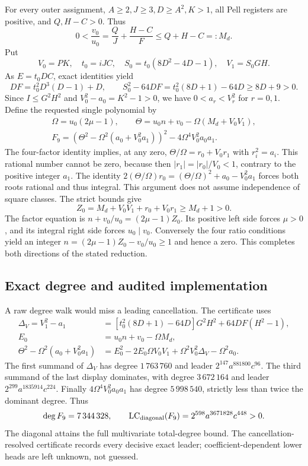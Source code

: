 For every outer assignment, \(A\geq2,J\geq3,D\geq A^2,K>1\), all Pell
registers are positive, and \(Q,H-C>0\). Thus
\[
 0<\frac{v_0}{u_0}=\frac QJ+\frac{H-C}{F}\leq Q+H-C=:M_d.
\]
Put
\[
 V_0=PK,\quad t_0=iJC,\quad S_0=t_0(8D^2-4D-1),\quad V_1=S_0GH.
\]
As \(E=t_0DC\), exact identities yield
\[
 DF=t_0^2D^3(D-1)+D,\qquad
 S_0^2-64DF=t_0^2(8D+1)-64D\geq8D+9>0.
\]
Since \(I\leq G^2H^2\) and \(V_0^2-a_0=K^2-1>0\), we have
\(0<a_r<V_r^2\) for \(r=0,1\).
Define the requested single polynomial by
\begin{gather*}
 \Omega=u_0(2\mu-1),\qquad
 \Theta=u_0n+v_0-\Omega(M_d+V_0V_1),\\
 \boxed{F_9=\left(\Theta^2-\Omega^2(a_0+V_0^2a_1)\right)^2
                    -4\Omega^4V_0^2a_0a_1.}
\end{gather*}
The four-factor identity implies, at any zero,
\(\Theta/\Omega=r_0+V_0r_1\) with \(r_i^2=a_i\).
This rational number cannot be zero, because then
\(|r_1|=|r_0|/V_0<1\), contrary to the positive integer \(a_1\).
The identity
\(2(\Theta/\Omega)r_0=(\Theta/\Omega)^2+a_0-V_0^2a_1\)
forces both roots rational and thus integral. This argument does not assume
independence of square classes.
The strict bounds give
\[
 Z_0=M_d+V_0V_1+r_0+V_0r_1\geq M_d+1>0.
\]
The factor equation is \(n+v_0/u_0=(2\mu-1)Z_0\).
Its positive left side forces \(\mu>0\), and its integral right side
forces \(u_0\mid v_0\). Conversely the four ratio conditions yield an
integer \(n=(2\mu-1)Z_0-v_0/u_0\geq1\) and hence a zero.
This completes both directions of the stated reduction.

\subsection{Exact degree and audited implementation}
A raw degree walk would miss a leading cancellation. The certificate uses
\begin{align*}
 \Delta_V=V_1^2-a_1
 &=[t_0^2(8D+1)-64D]G^2H^2+64DF(H^2-1),\\
 E_0&=u_0n+v_0-\Omega M_d,\\
 \Theta^2-\Omega^2(a_0+V_0^2a_1)
 &=E_0^2-2E_0\Omega V_0V_1+\Omega^2V_0^2\Delta_V-\Omega^2a_0.
\end{align*}
The first summand of \(\Delta_V\) has degree \(1\,763\,760\) and
leader \(2^{147}a^{881800}c^{96}\). The third summand of the last display
dominates, with degree \(3\,672\,164\) and leader
\(2^{299}a^{1835914}c^{224}\). Finally
\(4\Omega^4V_0^2a_0a_1\) has degree \(5\,998\,540\), strictly less than
twice the dominant degree. Thus
\[
 \deg F_9=7\,344\,328,\qquad
 \operatorname{LC}_{\rm diagonal}(F_9)=2^{598}a^{3671828}c^{448}>0.
\]
The diagonal attains the full multivariate total-degree bound. The
cancellation-resolved certificate records every decisive exact leader;
coefficient-dependent lower heads are left unknown, not guessed.

